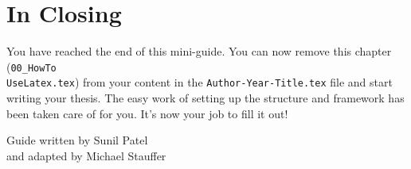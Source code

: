 
\section{In Closing}

You have reached the end of this mini-guide. You can now remove this chapter (\texttt{00\_HowTo\\UseLatex.tex}) from your content in the \texttt{Author-Year-Title.tex} file and start writing your thesis. The easy work of setting up the structure and framework has been taken care of for you. It's now your job to fill it out!

\begin{flushright}
Guide written by Sunil Patel\\
and adapted by Michael Stauffer\\
\end{flushright}
